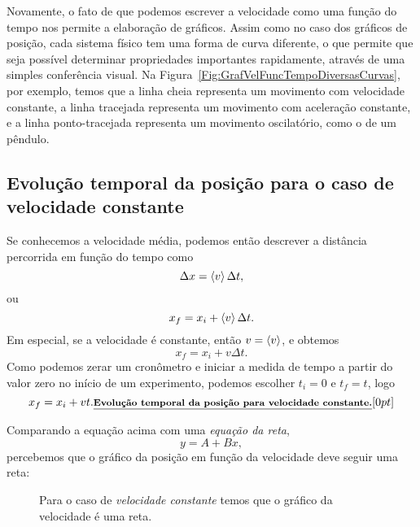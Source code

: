 Novamente, o fato de que podemos escrever a velocidade como uma função do tempo nos permite a elaboração de gráficos. Assim como no caso dos gráficos de posição, cada sistema físico tem uma forma de curva diferente, o que permite que seja possível determinar propriedades importantes rapidamente, através de uma simples conferência visual. Na Figura~\ref{Fig:GrafVelFuncTempoDiversasCurvas}, por exemplo, temos que a linha cheia representa um movimento com velocidade constante, a linha tracejada representa um movimento com aceleração constante, e a linha ponto-tracejada representa um movimento oscilatório, como o de um pêndulo.

\subsection{Evolução temporal da posição para o caso de velocidade constante}

Se conhecemos a velocidade média, podemos então descrever a distância percorrida em função do tempo como
\begin{equation}
  \Delta x = \left\langle{v}\right\rangle \Delta t,
\end{equation}
%
ou
\begin{equation}
    x_f = x_i + \left\langle{v}\right\rangle \Delta t.
\end{equation}
%
Em especial, se a velocidade é constante, então $v = \left\langle{v}\right\rangle$, e obtemos
\begin{equation}
    x_f = x_i + v \Delta t.
\end{equation}
%
Como podemos zerar um cronômetro e iniciar a medida de tempo a partir do valor zero no início de um experimento, podemos escolher $t_i = 0$ e $t_f = t$, logo
\begin{equation}\label{Eq:XX0AT}
  x_f = x_i + vt.\relax{\footnotesize\emph{\textbf{Evolução temporal da posição para velocidade constante.}}}[0pt]
\end{equation}

Comparando a equação acima com uma \emph{equação da reta},
\begin{equation}
    y = A + Bx,
\end{equation}
%
percebemos que o gráfico da posição em função da velocidade deve seguir uma reta:

\begin{figure}[!h]\forceversofloat
\centering
{}
\caption{Para o caso de \emph{velocidade constante} temos que o gráfico da velocidade é uma reta.}
\end{figure}

